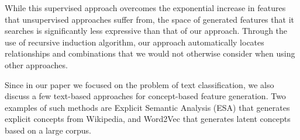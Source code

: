 \documentclass[twoside,11pt]{article}
\theoremstyle{definition}
\begin{document}
While this supervised approach overcomes the exponential increase in features that unsupervised approaches suffer from, the space of generated features that it searches is significantly less expressive than that of our approach.
Through the use of recursive induction algorithm, our approach automatically locates relationships and combinations that we would not otherwise consider when using other approaches.

Since in our paper we focused on the problem of text classification, we also discuss a few text-based approaches for concept-based feature generation. Two examples of such methods are Explicit Semantic Analysis (ESA) \cite{gabrilovich2009wikipediafull} that generates explicit concepts from Wikipedia, and Word2Vec \cite{mikolov2013distributed} that generates latent concepts based on a large corpus. 


\end{document}
